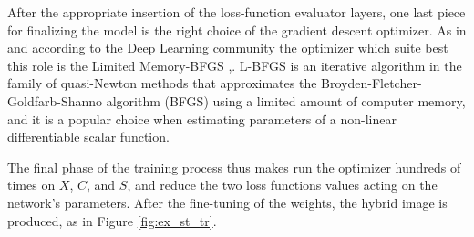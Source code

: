 After the appropriate insertion of the loss-function evaluator layers, one last piece for finalizing the model is the right choice of the gradient descent optimizer. As in \cite{1508.06576} and according to the Deep Learning community the optimizer which suite best this role is the Limited Memory-BFGS \cite{10.1093/imamat/6.1.76},\cite{shanno1970conditioning}. L-BFGS is an iterative algorithm in the family of quasi-Newton methods that approximates the Broyden-Fletcher-Goldfarb-Shanno algorithm (BFGS) using a limited amount of computer memory, and it is a popular choice when estimating parameters of a non-linear differentiable scalar function.

The final phase of the training process thus makes run the optimizer hundreds of times on $X$, $C$, and $S$, and reduce the two loss functions values acting on the network's parameters. After the fine-tuning of the weights, the hybrid image is produced, as in Figure \ref{fig:ex_st_tr}.

\clearpage
